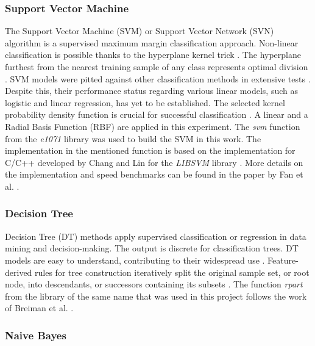 \let\LaTeXcline\cline\documentclass[sn-mathphys-num]{sn-jnl}\let\cline\LaTeXcline
\begin{document}
\subsubsection{Support Vector Machine}

The Support Vector Machine (SVM) or Support Vector Network (SVN) algorithm is a supervised maximum margin classification approach. Non-linear classification is possible thanks to the hyperplane kernel trick \cite{Boser1992}. The hyperplane furthest from the nearest training sample of any class represents optimal division \cite{HastieRosset2009}. SVM models were pitted against other classification methods in extensive tests \cite{Meyer2003}. Despite this, their performance status regarding various linear models, such as logistic and linear regression, has yet to be established. The selected kernel probability density function is crucial for successful classification \cite{Press2007}. A linear and a Radial Basis Function (RBF) are applied in this experiment. The \textit{svm} function from the \textit{e1071} library \cite{Meyer1999} was used to build the SVM in this work. The implementation in the mentioned function is based on the implementation for C/C++ developed by Chang and  Lin for the \textit{LIBSVM} library \cite{Chang2007}. More details on the implementation and speed benchmarks can be found in the paper by Fan et al. \cite{Fan2008}.

\subsubsection{Decision Tree}

Decision Tree (DT) methods apply supervised classification or regression in data mining and decision-making. The output is discrete for classification trees. DT models are easy to understand, contributing to their widespread use \cite{Wu2008}. Feature-derived rules for tree construction iteratively split the original sample set, or root node, into descendants, or successors containing its subsets \cite{ShalevShwartz2014}. The function \textit{rpart} from the library of the same name \cite{Therneau1999} that was used in this project follows the work of Breiman et al. \cite{Breiman1984}.

\subsubsection{Naive Bayes}
\end{document}
